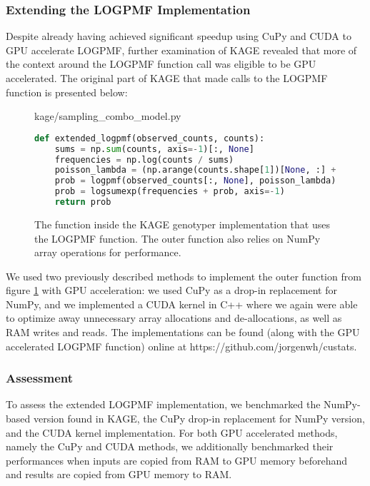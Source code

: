\subsubsection{Extending the LOGPMF Implementation}
Despite already having achieved significant speedup using CuPy and CUDA to GPU accelerate LOGPMF, further examination of KAGE revealed that more of the context around the LOGPMF function call was eligible to be GPU accelerated.
The original part of KAGE that made calls to the LOGPMF function is presented below:
\begin{figure}[H] 
\begin{center}
kage/sampling\_combo\_model.py
\end{center}
\begin{lstlisting}[language=Python,style=pycode]
def extended_logpmf(observed_counts, counts):
    sums = np.sum(counts, axis=-1)[:, None]
    frequencies = np.log(counts / sums)
    poisson_lambda = (np.arange(counts.shape[1])[None, :] + ERROR_RATE) * BASE_LAMBDA 
    prob = logpmf(observed_counts[:, None], poisson_lambda) # LOGPMF call is made here
    prob = logsumexp(frequencies + prob, axis=-1)
    return prob
\end{lstlisting}
\caption{
  The function inside the KAGE genotyper implementation that uses the LOGPMF function.
  The outer function also relies on NumPy array operations for performance.
}
\label{methods:gpu_accelerating_genotyping:figures:extended_logpmf_context}
\end{figure}

We used two previously described methods to implement the outer function from figure \ref{methods:gpu_accelerating_genotyping:figures:extended_logpmf_context} with GPU acceleration: we used CuPy as a drop-in replacement for NumPy, and we implemented a CUDA kernel in C++ where we again were able to optimize away unnecessary array allocations and de-allocations, as well as RAM writes and reads.
The implementations can be found (along with the GPU accelerated LOGPMF function) online at \url{}https://github.com/jorgenwh/custats.

\subsubsection{Assessment}
To assess the extended LOGPMF implementation, we benchmarked the NumPy-based version found in KAGE, the CuPy drop-in replacement for NumPy version, and the CUDA kernel implementation.
For both GPU accelerated methods, namely the CuPy and CUDA methods, we additionally benchmarked their performances when inputs are copied from RAM to GPU memory beforehand and results are copied from GPU memory to RAM.

